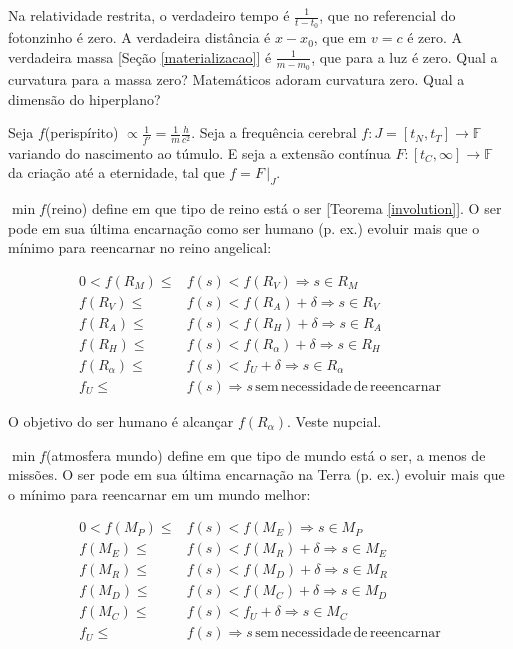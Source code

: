 \documentclass[12pt,a4paper]{article}
\begin{document}
			Na relatividade restrita, o verdadeiro tempo \'e $\frac{1}{t - t_0}$, que no referencial do fotonzinho \'e zero. A verdadeira dist\^ancia \'e $x - x_0$, que em $v = c$ \'e zero. A verdadeira massa [Se\c{c}\~ao \ref{materializacao}] \'e $\frac{1}{m - m_0}$, que para a luz \'e zero. Qual a curvatura para a massa zero? Matem\'aticos adoram curvatura zero. Qual a dimens\~ao do hiperplano?

			Seja $f$(perisp\'irito) $\propto \frac{1}{f'} = \frac{1}{m} \frac{h}{c^2}$. Seja a frequ\^encia cerebral $f: J = \left[t_N, t_T \right] \rightarrow \mathbb{F}$ variando do nascimento ao t\'umulo. E seja a extens\~ao cont\'inua $F: \left[t_C, \infty \right] \rightarrow \mathbb{F}$ da cria\c{c}\~ao at\'e a eternidade, tal que $f = F\,|_J$.

			$\min f$(reino) define em que tipo de reino est\'a o ser [Teorema \ref{involution}]. O ser pode em sua \'ultima encarna\c{c}\~ao como ser humano (p. ex.) evoluir mais que o m\'inimo para reencarnar no reino angelical:

			\begin{align*}
				0 < f(R_M) \le &f(s) < f(R_V) \Rightarrow s \in R_M \\
				f(R_V) \le &f(s) < f(R_A) + \delta \Rightarrow s \in R_V \\
				f(R_A) \le &f(s) < f(R_H) + \delta \Rightarrow s \in R_A \\
				f(R_H) \le &f(s) < f(R_\alpha) + \delta \Rightarrow s \in R_H \\
				f(R_\alpha) \le &f(s) < f_U + \delta \Rightarrow s \in R_\alpha \\
				f_U \le &f(s) \Rightarrow s \mathrm{\,sem\,necessidade\,de\,reeencarnar}
			\end{align*}

			O objetivo do ser humano \'e alcan\c{c}ar $f(R_\alpha)$. Veste nupcial\cite{batista}.

			$\min f$(atmosfera mundo) define em que tipo de mundo est\'a o ser, a menos de miss\~oes. O ser pode em sua \'ultima encarna\c{c}\~ao na Terra (p. ex.) evoluir mais que o m\'inimo para reencarnar em um mundo melhor:

			\begin{align*}
				0 < f(M_P) \le &f(s) < f(M_E) \Rightarrow s \in M_P \\
				f(M_E) \le &f(s) < f(M_R) + \delta \Rightarrow s \in M_E \\
				f(M_R) \le &f(s) < f(M_D) + \delta \Rightarrow s \in M_R \\
				f(M_D) \le &f(s) < f(M_C) + \delta \Rightarrow s \in M_D \\
				f(M_C) \le &f(s) < f_U + \delta \Rightarrow s \in M_C \\
				f_U \le &f(s) \Rightarrow s \mathrm{\,sem\,necessidade\,de\,reeencarnar}
			\end{align*}
\end{document}
